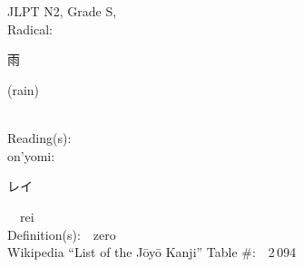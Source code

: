 \begin{multicols}{2}
\ \ \\
{\fontsize{34pt}{40pt}  }\ \ \\  %
{JLPT N2, Grade S, \\Radical:\ \ {\begin{CJK}{UTF8}{min} 雨 \end{CJK}} (rain) } \\
Reading(s):\ \ \\
{\hspace*{1em}}on'yomi:\ \ \\
{\hspace*{2em}}{\begin{CJK}{UTF8}{min} レイ \end{CJK}}\ \ rei\ \ \\
Definition(s):\ \ zero \\
Wikipedia ``List of the J\=oy\=o Kanji'' Table \#:\ \ 2\,094 \\
\ \ \\
\end{multicols}



